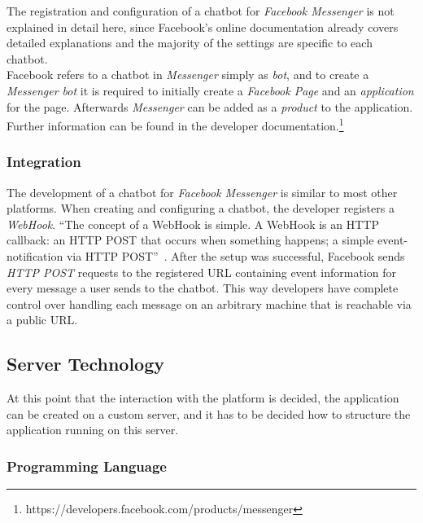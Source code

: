 The registration and configuration of a chatbot for \emph{Facebook Messenger} is not explained in detail here,
since Facebook's online documentation already covers detailed explanations
and the majority of the settings are specific to each chatbot.
\\
Facebook refers to a chatbot in \emph{Messenger} simply as \emph{bot},
and to create a \emph{Messenger bot} it is required to initially create a \emph{Facebook Page} and an \emph{application} for the page.
Afterwards \emph{Messenger} can be added as a \emph{product} to the application.
Further information can be found in the developer documentation.\footnote{https://developers.facebook.com/products/messenger}

\subsubsection{Integration}

The development of a chatbot for \emph{Facebook Messenger} is similar to most other platforms.
When creating and configuring a chatbot, the developer registers a \emph{WebHook}.
``The concept of a WebHook is simple. A WebHook is an HTTP callback: an HTTP POST that occurs when something happens; a simple event-notification via HTTP POST''~\cite{webhook}.
After the setup was successful,
Facebook sends \emph{HTTP POST} requests to the registered URL containing event information for every message a user sends to the chatbot.
This way developers have complete control over handling each message on an arbitrary machine that is reachable via a public URL.


\subsection{Server Technology}

At this point that the interaction with the platform is decided, the application can be created on a custom server,
and it has to be decided how to structure the application running on this server.


\subsubsection{Programming Language}

